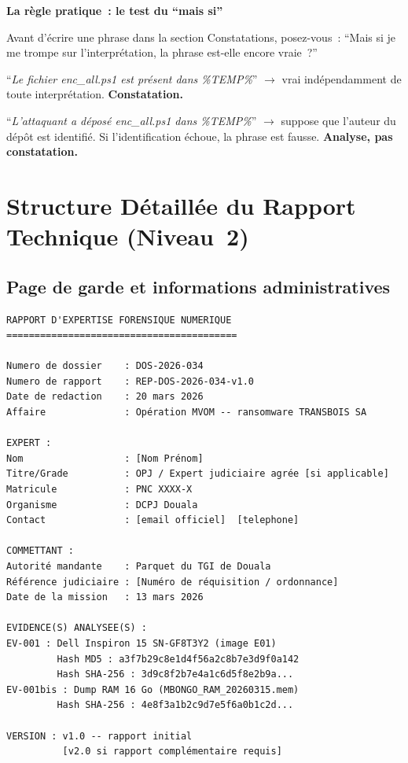 \begin{boxalert}
\textbf{La règle pratique~: le test du ``mais si''}

Avant d'écrire une phrase dans la section Constatations, posez-vous~:
``Mais si je me trompe sur l'interprétation, la phrase est-elle
encore vraie~?''

``\textit{Le fichier enc\_all.ps1 est présent dans \%TEMP\%}''
$\to$ vrai indépendamment de toute interprétation. \textbf{Constatation.}

``\textit{L'attaquant a déposé enc\_all.ps1 dans \%TEMP\%}''
$\to$ suppose que l'auteur du dépôt est identifié. Si l'identification
échoue, la phrase est fausse. \textbf{Analyse, pas constatation.}
\end{boxalert}

\section{Structure Détaillée du Rapport Technique (Niveau~2)}
\label{sec:structure-rapport}

\subsection{Page de garde et informations administratives}

\begin{lstlisting}[language=bash_forensique,
    caption={Métadonnées obligatoires --- page de garde}]
RAPPORT D'EXPERTISE FORENSIQUE NUMERIQUE
=========================================

Numero de dossier    : DOS-2026-034
Numero de rapport    : REP-DOS-2026-034-v1.0
Date de redaction    : 20 mars 2026
Affaire              : Opération MVOM -- ransomware TRANSBOIS SA

EXPERT :
Nom                  : [Nom Prénom]
Titre/Grade          : OPJ / Expert judiciaire agrée [si applicable]
Matricule            : PNC XXXX-X
Organisme            : DCPJ Douala
Contact              : [email officiel]  [telephone]

COMMETTANT :
Autorité mandante    : Parquet du TGI de Douala
Référence judiciaire : [Numéro de réquisition / ordonnance]
Date de la mission   : 13 mars 2026

EVIDENCE(S) ANALYSEE(S) :
EV-001 : Dell Inspiron 15 SN-GF8T3Y2 (image E01)
         Hash MD5 : a3f7b29c8e1d4f56a2c8b7e3d9f0a142
         Hash SHA-256 : 3d9c8f2b7e4a1c6d5f8e2b9a...
EV-001bis : Dump RAM 16 Go (MBONGO_RAM_20260315.mem)
         Hash SHA-256 : 4e8f3a1b2c9d7e5f6a0b1c2d...

VERSION : v1.0 -- rapport initial
          [v2.0 si rapport complémentaire requis]
\end{lstlisting}

